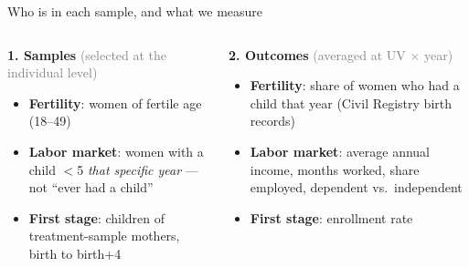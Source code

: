 \documentclass[aspectratio=169,10pt]{beamer}
\newcommand{\takeaway}[1]{\par\vspace{6pt}{\small\textcolor{steel}{$\Rightarrow$}\ \textbf{\textcolor{navy}{#1}}}}
\begin{document}
\begin{frame}{Who is in each sample, and what we measure}
\begin{columns}[T]
\begin{column}{0.48\textwidth}
{\small\textcolor{steel}{\textbf{1. Samples}} \textcolor{graytext}{(selected at the individual level)}}
\begin{itemize}
  \small
  \item \textbf{Fertility}: women of fertile age (18--49)
  \item \textbf{Labor market}: women with a child $<$5 \emph{that specific year} --- not ``ever had a child''
  \item \textbf{First stage}: children of treatment-sample mothers, birth to birth+4
\end{itemize}
\end{column}
\begin{column}{0.48\textwidth}
{\small\textcolor{steel}{\textbf{2. Outcomes}} \textcolor{graytext}{(averaged at UV $\times$ year)}}
\begin{itemize}
  \small
  \item \textbf{Fertility}: share of women who had a child that year (Civil Registry birth records)
  \item \textbf{Labor market}: average annual income, months worked, share employed, dependent vs.\ independent
  \item \textbf{First stage}: enrollment rate
\end{itemize}
\end{column}
\end{columns}

\vspace{8pt}

\takeaway{Each outcome is measured on its relevant population, from administrative records, averaged at the UV $\times$ year level.}
\end{frame}
\end{document}
